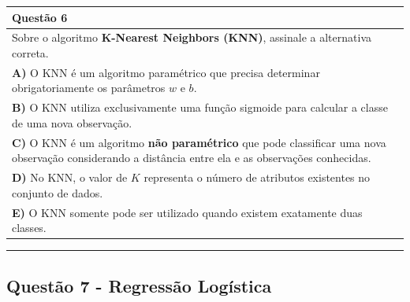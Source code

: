 \documentclass[
]{book}
\begin{document}
\begin{longtable}[]{@{}
  >{\raggedright\arraybackslash}p{}@{}}
\toprule\noalign{}
\begin{minipage}[b]{\linewidth}\raggedright
\textbf{Questão 6}
\end{minipage} \\
\midrule\noalign{}
\endhead
\bottomrule\noalign{}
\endlastfoot
Sobre o algoritmo \textbf{K-Nearest Neighbors (KNN)}, assinale a alternativa correta. \\
\textbf{A)} O KNN é um algoritmo paramétrico que precisa determinar obrigatoriamente os parâmetros \(w\) e \(b\). \\
\textbf{B)} O KNN utiliza exclusivamente uma função sigmoide para calcular a classe de uma nova observação. \\
\textbf{C)} O KNN é um algoritmo \textbf{não paramétrico} que pode classificar uma nova observação considerando a distância entre ela e as observações conhecidas. \\
\textbf{D)} No KNN, o valor de \(K\) representa o número de atributos existentes no conjunto de dados. \\
\textbf{E)} O KNN somente pode ser utilizado quando existem exatamente duas classes. \\
\end{longtable}

\begin{center}\rule{0.5\linewidth}{0.5pt}\end{center}

\subsection{Questão 7 - Regressão Logística}\label{questuxe3o-7---regressuxe3o-loguxedstica}
\end{document}
